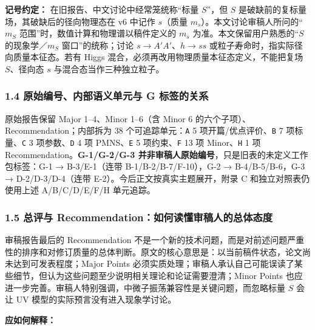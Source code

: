 \documentclass[
]{article}
\begin{document}
\textbf{记号约定：} 在旧报告、中文讨论中经常笼统称``标量 \(S\)''，但
\(S\) 是破缺前的复标量场，其破缺后的径向物理态在 v6 中记作 \(s\)（质量
\(m_s\)）。本文讨论审稿人所问的``\(m_S\)
范围''时，数值计算和物理谱以稿件定义的 \(m_s\)
为准。本文保留用户熟悉的``\(S\) 的现象学／\(m_S\) 窗口''的统称；讨论
\(s\to A\prime A\prime\)、\(h\to ss\)
或粒子寿命时，指实际径向质量本征态。若有 Higgs
混合，必须再改用物理质量本征态定义，不能把复场 \(S\)、径向态 \(s\)
与混合态当作三种独立粒子。

\subsubsection{1.4 原始编号、内部语义单元与 G
标签的关系}\label{ux539fux59cbux7f16ux53f7ux5185ux90e8ux8bedux4e49ux5355ux5143ux4e0e-g-ux6807ux7b7eux7684ux5173ux7cfb}

原始报告保留 Major 1--4、Minor 1--6（含 Minor 6
的六个子项）、Recommendation；内部拆为 38 个可追踪单元：\texttt{A} 5
项开篇/优点评价、\texttt{B} 7 项标量、\texttt{C} 3 项参数、\texttt{D} 4
项 PMNS、\texttt{E} 5 项约束、\texttt{F} 13 项 Minor、\texttt{H} 1 项
Recommendation。\textbf{G-1/G-2/G-3
并非审稿人原始编号}，只是旧表的未定义工作包标签：G-1 → B-3/E-1（连带
B-1/B-2/B-7/F-10），G-2 → B-4/B-5/B-6，G-3 → D-2/D-3/D-4（连带
E-2）。今后正文按真实主题展开，附录 C 和独立对照表仍使用上述
A/B/C/D/E/F/H 单元追踪。

\subsubsection{1.5 总评与
Recommendation：如何读懂审稿人的总体态度}\label{ux603bux8bc4ux4e0e-recommendationux5982ux4f55ux8bfbux61c2ux5ba1ux7a3fux4ebaux7684ux603bux4f53ux6001ux5ea6}

审稿报告最后的 Recommendation
不是一个新的技术问题，而是对前述问题严重性的排序和对修订质量的总体判断。原文的核心意思是：以当前稿件状态，论文尚未达到可发表程度；Major
Points
必须实质处理；审稿人承认自己可能误读了某些细节，但认为这些问题至少说明相关理论和论证需要澄清；Minor
Points
也应进一步完善。审稿人特别强调，中微子振荡兼容性是关键问题，而忽略标量
\(S\) 会让 UV 模型的实际预言没有进入现象学讨论。

\textbf{应如何解释：}
\end{document}
